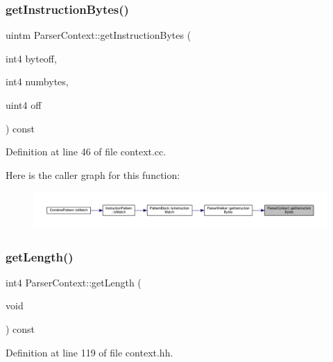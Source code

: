 \subsubsection{\texorpdfstring{getInstructionBytes()}{getInstructionBytes()}}
{\footnotesize\ttfamily uintm Parser\+Context\+::get\+Instruction\+Bytes (\begin{DoxyParamCaption}\item[{int4}]{byteoff,  }\item[{int4}]{numbytes,  }\item[{uint4}]{off }\end{DoxyParamCaption}) const}



Definition at line 46 of file context.\+cc.

Here is the caller graph for this function\+:
\nopagebreak
\begin{figure}[H]
\begin{center}
\leavevmode
\includegraphics[width=350pt]{class_parser_context_a5112f754f6655d02c1515a6667e9328e_icgraph}
\end{center}
\end{figure}
\mbox{\label{class_parser_context_a9771627b94baf35822436ae402cce979}} 
\subsubsection{\texorpdfstring{getLength()}{getLength()}}
{\footnotesize\ttfamily int4 Parser\+Context\+::get\+Length (\begin{DoxyParamCaption}\item[{void}]{ }\end{DoxyParamCaption}) const\hspace{0.3cm}{\ttfamily [inline]}}



Definition at line 119 of file context.\+hh.

